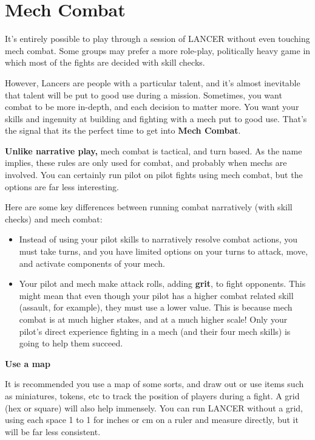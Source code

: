 \chapter{Mech Combat}
It's entirely possible to play through a session of LANCER without even touching mech combat. Some groups may prefer a more role-play, politically heavy game in which most of the fights are decided with skill checks.

However, Lancers are people with a particular talent, and it's almost inevitable that talent will be put to good use during a mission. Sometimes, you want combat to be more in-depth, and each decision to matter more. You want your skills and ingenuity at building and fighting with a mech put to good use. That's the signal that its the perfect time to get into \textbf{Mech Combat}.

\textbf{Unlike narrative play,} mech combat is tactical, and turn based. As the name implies, these rules are only used for combat, and probably when mechs are involved. You can certainly run pilot on pilot fights using mech combat, but the options are far less interesting. 

Here are some key differences between running combat narratively (with skill checks) and mech combat:
\begin{itemize}
    \item Instead of using your pilot skills to narratively resolve combat actions, you must take turns, and you have limited options on your turns to attack, move, and activate components of your mech.
    \item Your pilot and mech make attack rolls, adding \textbf{grit}, to fight opponents. This might mean that even though your pilot has a higher combat related skill (assault, for example), they must use a lower value. This is because mech combat is at much higher stakes, and at a much higher scale! Only your pilot's direct experience fighting in a mech (and their four mech skills) is going to help them succeed.
\end{itemize}

\begin{center}
\textbf{Use a map}
\end{center}

It is recommended you use a map of some sorts, and draw out or use items such as miniatures, tokens, etc to track the position of players during a fight. A grid (hex or square) will also help immensely. You can run LANCER without a grid, using each space 1 to 1 for inches or cm on a ruler and measure directly, but it will be far less consistent.

